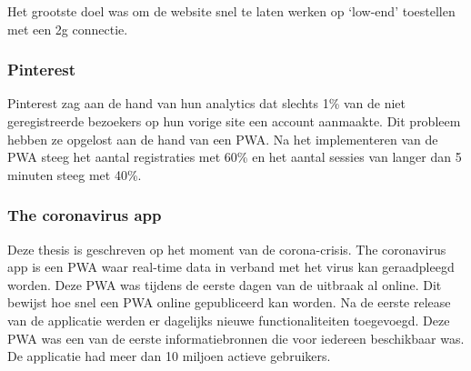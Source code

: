 		Het grootste doel was om de website snel te laten werken op ‘low-end’ toestellen met een 2g connectie. 
		\autocite{Croll2017}
	
	\subsubsection{Pinterest}
	
		Pinterest zag aan de hand van hun analytics dat slechts 1\% van de niet geregistreerde bezoekers op hun vorige site een account aanmaakte. Dit probleem hebben ze opgelost aan de hand van een PWA.
		Na het implementeren van de PWA steeg het aantal registraties met 60\% en het aantal sessies van langer dan 5 minuten steeg met 40\%.
		\autocite{Osmani2019b}
		
		
	\subsubsection{The coronavirus app}
	
		Deze thesis is geschreven op het moment van de corona-crisis. The coronavirus app is een PWA waar real-time data in verband met het virus kan geraadpleegd worden. 
		Deze PWA was tijdens de eerste dagen van de uitbraak al online. Dit bewijst hoe snel een PWA online gepubliceerd kan worden.
		Na de eerste release van de applicatie werden er dagelijks nieuwe functionaliteiten toegevoegd. 
		Deze PWA was een van de eerste informatiebronnen die voor iedereen beschikbaar was. De applicatie had meer dan 10 miljoen actieve gebruikers. 
		
		